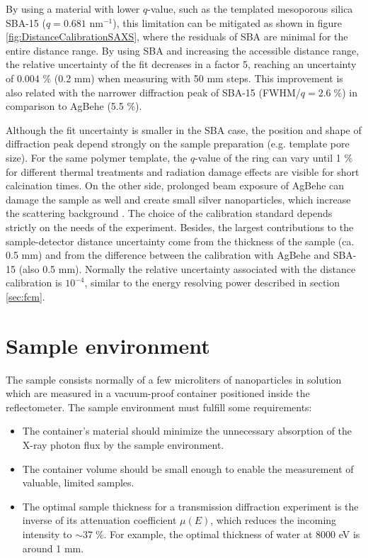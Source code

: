 By using a material with lower $q$-value, such as the templated mesoporous silica SBA-15 \citep{zhao_triblock_1998} ($q=0.681$ nm$^{-1}$), this limitation can be mitigated as shown in figure \ref{fig:DistanceCalibrationSAXS}, where the residuals of SBA are minimal for the entire distance range. By using SBA and increasing the accessible distance range, the relative uncertainty of the fit decreases in a factor 5, reaching an uncertainty of 0.004 $\%$ (0.2 mm) when measuring with 50 mm steps. This improvement is also related with the narrower diffraction peak of SBA-15 (FWHM/$q=2.6\;\%$) in comparison to AgBehe (5.5 $\%$).

Although the fit uncertainty is smaller in the SBA case, the position and shape of diffraction peak depend strongly on the sample preparation (e.g. template pore size). For the same polymer template, the $q$-value of the ring can vary until 1 $\%$ for different thermal treatments and radiation damage effects are visible for short calcination times. On the other side, prolonged beam exposure of AgBehe can damage the sample as well and create small silver nanoparticles, which increase the scattering background \citep{liu_thermal_2006}. The choice of the calibration standard depends strictly on the needs of the experiment. Besides, the largest contributions to the sample-detector distance uncertainty come from the thickness of the sample (ca. 0.5 mm) and from the difference between the calibration with AgBehe and SBA-15 (also 0.5 mm). Normally the relative uncertainty associated with the distance calibration is $10^{-4}$, similar to the energy resolving power described in section \ref{sec:fcm}.

\section{Sample environment}
\label{sec:sample_environment}

The sample consists normally of a few microliters of nanoparticles in solution which are measured in a vacuum-proof container positioned inside the reflectometer. The sample environment must fulfill some requirements:

\begin{itemize}
        \item The container's material should minimize the unnecessary absorption of the X-ray photon flux by the sample environment.
        \item The container volume should be small enough to enable the measurement of valuable, limited samples.
        \item The optimal sample thickness for a transmission diffraction experiment is the inverse of its attenuation coefficient $\mu(E)$, which reduces the incoming intensity to $\sim37\;\%$. For example, the optimal thickness of water at 8000 eV is around 1 mm.
\end{itemize}

